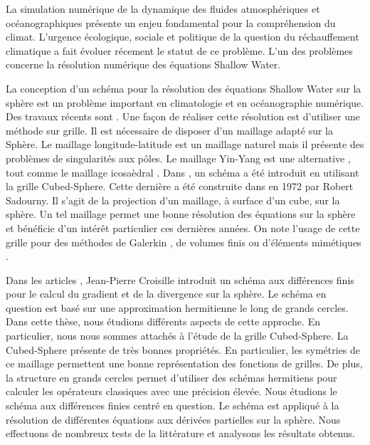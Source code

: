 La simulation numérique de la dynamique des fluides atmosphériques et océanographiques présente un enjeu fondamental pour la compréhension du climat. L'urgence écologique, sociale et politique de la question du réchauffement climatique a fait évoluer récement le statut de ce problème. L'un des problèmes concerne la résolution numérique des équations Shallow Water.

La conception d'un schéma pour la résolution des équations Shallow Water sur la sphère est un problème important en climatologie et en océanographie numérique. Des travaux récents sont \cite{Nair2010, Qaddouri2012, Ullrich2011}. Une façon de réaliser cette résolution est d'utiliser une méthode sur grille. Il est nécessaire de disposer d'un maillage adapté sur la Sphère. Le maillage longitude-latitude est un maillage naturel mais il présente des problèmes de singularités aux pôles. Le maillage Yin-Yang est une alternative \cite{Kageyama2004, Li2008}, tout comme le maillage icosaèdral \cite{Stuhne1999}. 
Dans \cite{Croisille2015, Croisille2013}, un schéma a été introduit en utilisant la grille Cubed-Sphere. Cette dernière a été construite dans \cite{Sadourny1972} en 1972 par Robert Sadourny. Il s'agit de la projection d'un maillage, à surface d'un cube, sur la sphère. Un tel maillage permet une bonne résolution des équations sur la sphère \cite{Ronchi1996} et bénéficie d'un intérêt particulier ces dernières années. On note l'usage de cette grille pour des méthodes de Galerkin \cite{Nair2010}, de volumes finis \cite{Chen2008,Ullrich2011} ou d'éléments mimétiques \cite{Lauritzen2010}.

Dans les articles \cite{Croisille2015,Croisille2013}, Jean-Pierre Croisille introduit un schéma aux différences finis pour le calcul du gradient et de la divergence sur la sphère. Le schéma en question est basé sur une approximation hermitienne le long de grands cercles. Dans cette thèse, nous étudions différents aspects de cette approche. En particulier, nous nous sommes attachés à l'étude de la grille Cubed-Sphere. La Cubed-Sphere présente de très bonnes propriétés. En particulier, les symétries de ce maillage permettent une bonne représentation des fonctions de grilles. De plus, la structure en grands cercles permet d'utiliser des schémas hermitiens pour calculer les opérateurs classiques avec une précision élevée. Nous étudions le schéma aux différences finies centré en question. Le schéma est appliqué à la résolution de différentes équations aux dérivées partielles sur la sphère. Nous effectuons de nombreux tests de la littérature et analysons les résultats obtenus.




